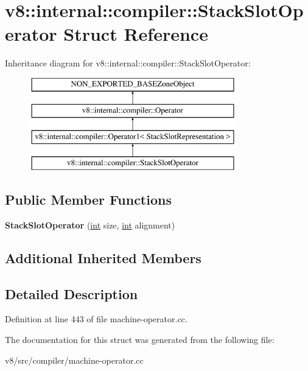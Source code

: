 \hypertarget{structv8_1_1internal_1_1compiler_1_1StackSlotOperator}{}\section{v8\+:\+:internal\+:\+:compiler\+:\+:Stack\+Slot\+Operator Struct Reference}
\label{structv8_1_1internal_1_1compiler_1_1StackSlotOperator}
Inheritance diagram for v8\+:\+:internal\+:\+:compiler\+:\+:Stack\+Slot\+Operator\+:\begin{figure}[H]
\begin{center}
\leavevmode
\includegraphics[height=4.000000cm]{structv8_1_1internal_1_1compiler_1_1StackSlotOperator}
\end{center}
\end{figure}
\subsection*{Public Member Functions}
\begin{DoxyCompactItemize}
\item 
\mbox{\label{structv8_1_1internal_1_1compiler_1_1StackSlotOperator_af683518660d5dd504c77bbad0b66cd8c}} 
{\bfseries Stack\+Slot\+Operator} (\mbox{\hyperlink{classint}{int}} size, \mbox{\hyperlink{classint}{int}} alignment)
\end{DoxyCompactItemize}
\subsection*{Additional Inherited Members}


\subsection{Detailed Description}


Definition at line 443 of file machine-\/operator.\+cc.



The documentation for this struct was generated from the following file\+:\begin{DoxyCompactItemize}
\item 
v8/src/compiler/machine-\/operator.\+cc\end{DoxyCompactItemize}
